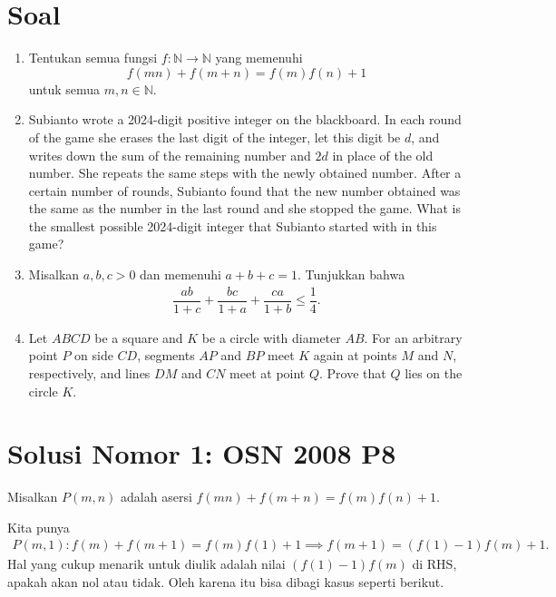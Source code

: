 \documentclass[a4paper, 12pt]{scrartcl}
\begin{document}
\section{Soal}
\begin{enumerate}
    \item Tentukan semua fungsi $f:\mathbb{N}\rightarrow \mathbb{N}$ yang memenuhi
    \[f(mn)+f(m+n)=f(m)f(n)+1\]
    untuk semua $m, n\in \mathbb{N}$.

    \item Subianto wrote a 2024-digit positive integer on the blackboard. In each round of the game she erases the last digit of the integer, let this digit be $d$, and writes down the sum of the remaining number and $2d$ in place of the old number. She repeats the same steps with the newly obtained number. After a certain number of rounds, Subianto found that the new number obtained was the same as the number in the last round and she stopped the game. What is the smallest possible 2024-digit integer that Subianto started with in this game?
    
    \item Misalkan $a,b,c > 0$ dan memenuhi $a+b+c=1$. Tunjukkan bahwa
    \begin{align*}
    \dfrac{ab}{1+c}+\dfrac{bc}{1+a}+\dfrac{ca}{1+b} \le \dfrac{1}{4}.
    \end{align*}

    \item Let $ABCD$ be a square and $K$ be a circle with diameter $AB$. For an arbitrary point $P$ on side $CD$, segments $AP$ and $BP$ meet $K$ again at points $M$ and $N$, respectively, and lines $DM$ and $CN$ meet at point $Q$. Prove that $Q$ lies on the circle $K$.
\end{enumerate}

\newpage
\section{Solusi Nomor 1: OSN 2008 P8}
Misalkan $P(m,n)$ adalah asersi $f(mn)+f(m+n)=f(m)f(n)+1$.

Kita punya
\begin{align*}
    P(m,1): f(m)+f(m+1)=f(m)f(1)+1 \implies f(m+1)=(f(1)-1)f(m)+1.
\end{align*}
Hal yang cukup menarik untuk diulik adalah nilai $(f(1)-1)f(m)$ di RHS, apakah akan nol atau tidak. Oleh karena itu bisa dibagi kasus seperti berikut.\\
\end{document}
